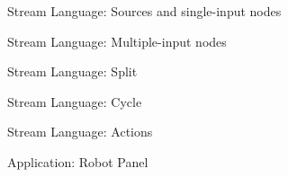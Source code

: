 \documentclass{beamer}
\begin{document}
	\begin{frame}{Stream Language: Sources and single-input nodes}
	  \begin{minipage}{.5\textwidth}\centering
		\end{minipage}
		\hfill
		\begin{minipage}{.4\textwidth}\centering
		  
	  \end{minipage}
  \end{frame}
  \begin{frame}{Stream Language: Multiple-input nodes}
	  \begin{minipage}{.5\textwidth}\centering
		\end{minipage}
		\hfill
		\begin{minipage}{.4\textwidth}\centering
		  
	  \end{minipage}
	\end{frame}
  \begin{frame}{Stream Language: Split}
	  \begin{minipage}{.5\textwidth}\centering
		\end{minipage}
		\hfill
		\begin{minipage}{.4\textwidth}\centering
		  
	  \end{minipage}
	\end{frame}
	\begin{frame}{Stream Language: Cycle}
	  \begin{minipage}{.5\textwidth}\centering
		\end{minipage}
		\hfill
		\begin{minipage}{.4\textwidth}\centering
		  
	  \end{minipage}
	\end{frame}
	\begin{frame}{Stream Language: Actions}
	  \begin{minipage}{.5\textwidth}\centering
		\end{minipage}
		\hspace{1cm}
		\begin{minipage}{.3\textwidth}\centering
		  
	  \end{minipage}
	\end{frame}
	
	\begin{frame}{Application: Robot Panel}
	\end{frame}
	
\end{document}
